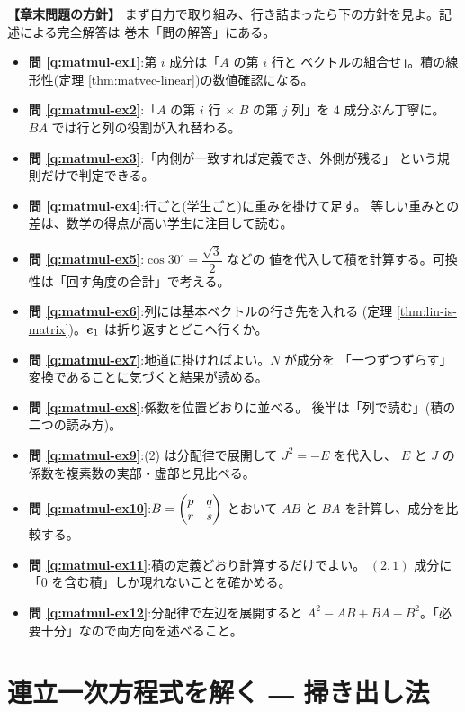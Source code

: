 \bigskip
{\small
\noindent\textbf{【章末問題の方針】}\quad
まず自力で取り組み、行き詰まったら下の方針を見よ。記述による完全解答は
巻末「問の解答」にある。
\begin{itemize}
\item \textbf{問 \ref{q:matmul-ex1}}:第 $i$ 成分は「$A$ の第 $i$ 行と
ベクトルの組合せ」。積の線形性(定理 \ref{thm:matvec-linear})の数値確認になる。
\item \textbf{問 \ref{q:matmul-ex2}}:「$A$ の第 $i$ 行 $\times$ $B$ の第 $j$ 列」を
$4$ 成分ぶん丁寧に。$BA$ では行と列の役割が入れ替わる。
\item \textbf{問 \ref{q:matmul-ex3}}:「内側が一致すれば定義でき、外側が残る」
という規則だけで判定できる。
\item \textbf{問 \ref{q:matmul-ex4}}:行ごと(学生ごと)に重みを掛けて足す。
等しい重みとの差は、数学の得点が高い学生に注目して読む。
\item \textbf{問 \ref{q:matmul-ex5}}:$\cos 30^\circ = \dfrac{\sqrt{3}}{2}$ などの
値を代入して積を計算する。可換性は「回す角度の合計」で考える。
\item \textbf{問 \ref{q:matmul-ex6}}:列には基本ベクトルの行き先を入れる
(定理 \ref{thm:lin-is-matrix})。$\bm{e}_1$ は折り返すとどこへ行くか。
\item \textbf{問 \ref{q:matmul-ex7}}:地道に掛ければよい。$N$ が成分を
「一つずつずらす」変換であることに気づくと結果が読める。
\item \textbf{問 \ref{q:matmul-ex8}}:係数を位置どおりに並べる。
後半は「列で読む」(積の二つの読み方)。
\item \textbf{問 \ref{q:matmul-ex9}}:(2) は分配律で展開して $J^2 = -E$ を代入し、
$E$ と $J$ の係数を複素数の実部・虚部と見比べる。
\item \textbf{問 \ref{q:matmul-ex10}}:$B = \begin{pmatrix}p & q \\ r & s\end{pmatrix}$ とおいて
$AB$ と $BA$ を計算し、成分を比較する。
\item \textbf{問 \ref{q:matmul-ex11}}:積の定義どおり計算するだけでよい。
$(2,1)$ 成分に「$0$ を含む積」しか現れないことを確かめる。
\item \textbf{問 \ref{q:matmul-ex12}}:分配律で左辺を展開すると
$A^2 - AB + BA - B^2$。「必要十分」なので両方向を述べること。
\end{itemize}
}

\chapter{連立一次方程式を解く ― 掃き出し法}\label{chap:gauss}


